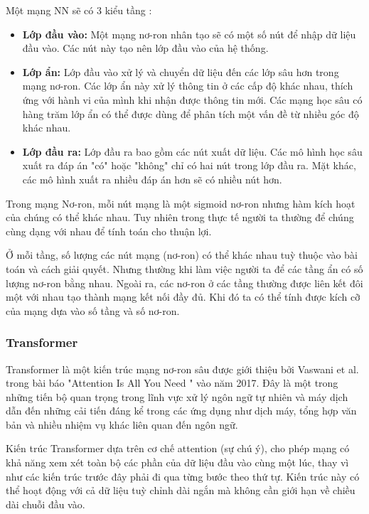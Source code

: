 Một mạng NN sẽ có 3 kiểu tầng \cite{aws-deep-learning}:
\begin{itemize}
    \item \textbf{Lớp đầu vào:} Một mạng nơ-ron nhân tạo sẽ có một số nút để nhập dữ liệu đầu vào. Các nút này tạo nên lớp đầu vào của hệ thống.
    \item \textbf{Lớp ẩn:} Lớp đầu vào xử lý và chuyển dữ liệu đến các lớp sâu hơn trong mạng nơ-ron. Các lớp ẩn này xử lý thông tin ở các cấp độ khác nhau, thích ứng với hành vi của mình khi nhận được thông tin mới. Các mạng học sâu có hàng trăm lớp ẩn có thể được dùng để phân tích một vấn đề từ nhiều góc độ khác nhau.
    \item \textbf{Lớp đầu ra:} Lớp đầu ra bao gồm các nút xuất dữ liệu. Các mô hình học sâu xuất ra đáp án "có" hoặc "không" chỉ có hai nút trong lớp đầu ra. Mặt khác, các mô hình xuất ra nhiều đáp án hơn sẽ có nhiều nút hơn.
\end{itemize}

Trong mạng Nơ-ron, mỗi nút mạng là một sigmoid nơ-ron nhưng hàm kích hoạt của chúng có thể khác nhau. Tuy nhiên trong thực tế người ta thường để chúng cùng dạng với nhau để tính toán cho thuận lợi.

Ở mỗi tầng, số lượng các nút mạng (nơ-ron) có thể khác nhau tuỳ thuộc vào bài toán và cách giải quyết. Nhưng thường khi làm việc người ta để các tầng ẩn có số lượng nơ-ron bằng nhau. Ngoài ra, các nơ-ron ở các tầng thường được liên kết đôi một với nhau tạo thành mạng kết nối đầy đủ. Khi đó ta có thể tính được kích cỡ của mạng dựa vào số tầng và số nơ-ron.

\subsubsection{Transformer}
Transformer là một kiến trúc mạng nơ-ron sâu được giới thiệu bởi Vaswani et al. trong bài báo "Attention Is All You Need \cite{vaswani2023attention}" vào năm 2017. Đây là một trong những tiến bộ quan trọng trong lĩnh vực xử lý ngôn ngữ tự nhiên và máy dịch dẫn đến những cải tiến đáng kể trong các ứng dụng như dịch máy, tổng hợp văn bản và nhiều nhiệm vụ khác liên quan đến ngôn ngữ.

Kiến trúc Transformer dựa trên cơ chế attention (sự chú ý), cho phép mạng có khả năng xem xét toàn bộ các phần của dữ liệu đầu vào cùng một lúc, thay vì như các kiến trúc trước đây phải đi qua từng bước theo thứ tự. Kiến trúc này có thể hoạt động với cả dữ liệu tuỳ chỉnh dài ngắn mà không cần giới hạn về chiều dài chuỗi đầu vào.

